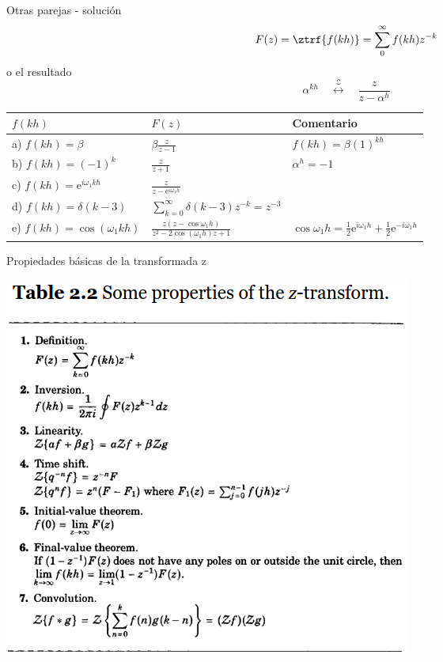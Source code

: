 \documentclass[presentation,aspectratio=169]{beamer}
\begin{document}
\begin{frame}[label={sec:orgc257b4e}]{Otras parejas - solución}
\[ F(z) = \ztrf{f(kh)} = \sum_0^\infty f(kh)z^{-k} \] o el resultado
\[ \alpha^{kh} \quad  \overset{\mathcal{Z}}{\longleftrightarrow} \quad \frac{z}{z-\alpha^h} \]

\begin{center}
\begin{tabular}{lll}
\(f(kh)\) & \(F(z)\) & Comentario\\
\hline
a) \(f(kh)=\beta\) & \(\beta \frac{z}{z-1}\) & \(f(kh) = \beta (1)^{kh}\)\\
b) \(f(kh)=(-1)^k\) & \(\frac{z}{z+1}\) & \(\alpha^h = -1\)\\
c) \(f(kh) = \mathrm{e}^{i\omega_1 kh}\) & \(\frac{z}{z - \mathrm{e}^{i\omega_1h}}\) & \\
d) \(f(kh) =  \delta(k-3)\) & \(\sum_{k=0}^\infty \delta(k-3)z^{-k} = z^{-3}\) & \\
e) \(f(kh) = \cos(\omega_1 kh)\) & \(\frac{z(z-\cos\omega_1h)}{z^2 - 2\cos(\omega_1h) z + 1}\) & \(\cos\omega_1h = \frac{1}{2}\mathrm{e}^{i\omega_1 h} + \frac{1}{2} \mathrm{e}^{-i\omega_1h}\)\\
\end{tabular}
\end{center}
\end{frame}



\begin{frame}[label={sec:orgac424b4}]{Propiedades básicas de la transformada z}
\begin{center}
\includegraphics[height=0.8\textheight]{../../figures/table2-2.png}
\end{center}
\end{frame}
\end{document}
